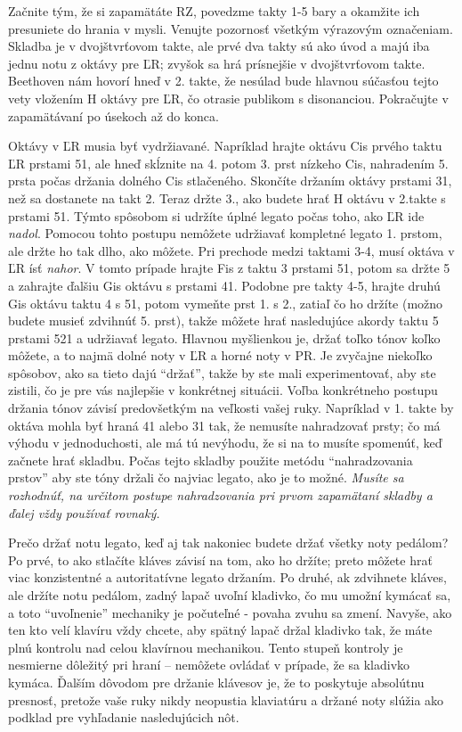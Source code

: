 Začnite tým, že si zapamätáte RZ, povedzme takty 1-5 bary a okamžite ich presuniete do hrania v mysli. Venujte pozornosť všetkým výrazovým označeniam. Skladba je v dvojštvrťovom takte, ale prvé dva takty sú ako úvod a majú iba jednu notu z oktávy pre ĽR; zvyšok sa hrá prísnejšie v dvojštvrťovom takte. Beethoven nám hovorí hneď v 2. takte, že nesúlad bude hlavnou súčasťou tejto vety vložením H oktávy pre ĽR, čo otrasie publikom s disonanciou. Pokračujte v zapamätávaní po úsekoch až do konca.

Oktávy v ĽR musia byť vydržiavané. Napríklad hrajte oktávu Cis prvého taktu ĽR prstami 51, ale hneď skĺznite na 4. potom 3. prst nízkeho Cis, nahradením 5. prsta počas držania dolného Cis stlačeného. Skončíte držaním oktávy prstami 31, než sa dostanete na takt 2. Teraz držte 3., ako budete hrať H oktávu v 2.takte s prstami 51. Týmto spôsobom si udržíte úplné legato počas toho, ako ĽR ide \textit{nadol}. Pomocou tohto postupu nemôžete udržiavať kompletné legato 1. prstom, ale držte ho tak dlho, ako môžete. Pri prechode medzi taktami 3-4, musí oktáva v ĽR ísť \textit{nahor}. V tomto prípade hrajte Fis z taktu 3 prstami 51, potom sa držte 5 a zahrajte ďalšiu Gis oktávu s prstami 41. Podobne pre takty 4-5, hrajte druhú Gis oktávu taktu 4 s 51, potom vymeňte prst 1. s 2., zatiaľ čo ho držíte (možno budete musieť zdvihnúť 5. prst), takže môžete hrať nasledujúce akordy taktu 5 prstami 521 a udržiavať legato. Hlavnou myšlienkou je, držať toľko tónov koľko môžete, a to najmä dolné noty v ĽR a horné noty v PR. Je zvyčajne niekoľko spôsobov, ako sa tieto dajú “držať”, takže by ste mali experimentovať, aby ste zistili, čo je pre vás najlepšie v konkrétnej situácii. Voľba konkrétneho postupu držania tónov závisí predovšetkým na veľkosti vašej ruky. Napríklad v 1. takte by oktáva mohla byť hraná 41 alebo 31 tak, že nemusíte nahradzovať prsty; čo má výhodu v jednoduchosti, ale má tú nevýhodu, že si na to musíte spomenúť, keď začnete hrať skladbu. Počas tejto skladby použite metódu “nahradzovania prstov” aby ste tóny držali čo najviac legato, ako je to možné. \emph{Musíte sa rozhodnúť, na určitom postupe nahradzovania pri prvom zapamätaní skladby a ďalej vždy používať rovnaký.}

Prečo držať notu legato, keď aj tak nakoniec budete držať všetky noty pedálom? Po prvé, to ako stlačíte kláves závisí na tom, ako ho držíte; preto môžete hrať viac konzistentné a autoritatívne legato držaním. Po druhé, ak zdvihnete kláves, ale držíte notu pedálom, zadný lapač uvoľní kladivko, čo mu umožní kymácať sa, a toto “uvoľnenie” mechaniky je počuteľné - povaha zvuhu sa zmení. Navyše, ako ten kto velí klavíru vždy chcete, aby spätný lapač držal kladivko tak, že máte plnú kontrolu nad celou klavírnou mechanikou. Tento stupeň kontroly je nesmierne dôležitý pri hraní  – nemôžete ovládať  v prípade, že sa kladivko kymáca. Ďalším dôvodom pre držanie klávesov je, že to poskytuje absolútnu presnosť, pretože vaše ruky nikdy neopustia klaviatúru a držané noty slúžia ako podklad pre vyhľadanie nasledujúcich nôt.

